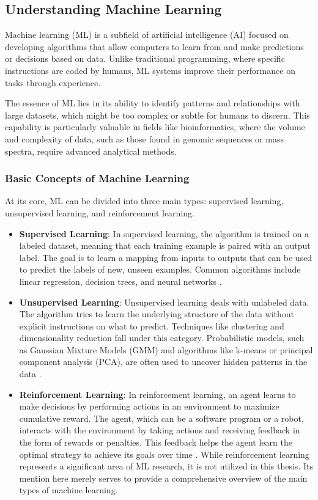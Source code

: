 \documentclass[english,11pt,a4paper,titlepage]{article}
\begin{document}
	\subsection*{Understanding Machine Learning}
	Machine learning (ML) is a subfield of artificial intelligence (AI) focused on developing algorithms that allow computers to learn from and make predictions or decisions based on data. Unlike traditional programming, where specific instructions are coded by humans, ML systems improve their performance on tasks through experience.
	
	The essence of ML lies in its ability to identify patterns and relationships with large datasets, which might be too complex or subtle for humans to discern. This capability is particularly valuable in fields like bioinformatics, where the volume and complexity of data, such as those found in genomic sequences or mass spectra, require advanced analytical methods.
	
	\subsubsection*{Basic Concepts of Machine Learning}
	At its core, ML can be divided into three main types: supervised learning, unsupervised learning, and reinforcement learning.
	\begin{itemize}
		\item \textbf{Supervised Learning}: In supervised learning, the algorithm is trained on a labeled dataset, meaning that each training example is paired with an output label. The goal is to learn a mapping from inputs to outputs that can be used to predict the labels of new, unseen examples. Common algorithms include linear regression, decision trees, and neural networks \cite{jordanMachineLearningTrends2015}.
		\item \textbf{Unsupervised Learning}: Unsupervised learning deals with unlabeled data. The algorithm tries to learn the underlying structure of the data without explicit instructions on what to predict. Techniques like clustering and dimensionality reduction fall under this category. Probabilistic models, such as Gaussian Mixture Models (GMM) and algorithms like k-means or principal component analysis (PCA), are often used to uncover hidden patterns in the data \cite{ghahramaniProbabilisticMachineLearning2015}.
		\item \textbf{Reinforcement Learning}: In reinforcement learning, an agent learns to make decisions by performing actions in an environment to maximize cumulative reward. The agent, which can be a software program or a robot, interacts with the environment by taking actions and receiving feedback in the form of rewards or penalties. This feedback helps the agent learn the optimal strategy to achieve its goals over time \cite{suttonReinforcementLearningIntroduction}. While reinforcement learning represents a significant area of ML research, it is not utilized in this thesis. Its mention here merely serves to provide a comprehensive overview of the main types of machine learning.
	\end{itemize}
	
\end{document}
